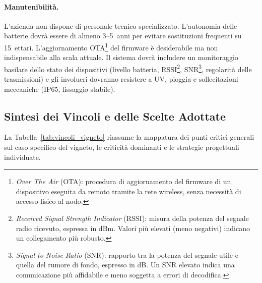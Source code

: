 \paragraph{Manutenibilità.} L'azienda non dispone di personale tecnico specializzato. L'autonomia delle batterie dovrà essere di almeno 3--5~anni per evitare sostituzioni frequenti su 15~ettari. L'aggiornamento OTA\footnote{\textit{Over The Air} (OTA): procedura di aggiornamento del firmware di un dispositivo eseguita da remoto tramite la rete wireless, senza necessità di accesso fisico al nodo.} del firmware è desiderabile ma non indispensabile alla scala attuale. Il sistema dovrà includere un monitoraggio basilare dello stato dei dispositivi (livello batteria, RSSI\footnote{\textit{Received Signal Strength Indicator} (RSSI): misura della potenza del segnale radio ricevuto, espressa in dBm. Valori più elevati (meno negativi) indicano un collegamento più robusto.}, SNR\footnote{\textit{Signal-to-Noise Ratio} (SNR): rapporto tra la potenza del segnale utile e quella del rumore di fondo, espresso in dB. Un SNR elevato indica una comunicazione più affidabile e meno soggetta a errori di decodifica.}, regolarità delle trasmissioni) e gli involucri dovranno resistere a UV, pioggia e sollecitazioni meccaniche (IP65, fissaggio stabile).

\subsection{Sintesi dei Vincoli e delle Scelte Adottate}

La Tabella~\ref{tab:vincoli_vigneto} riassume la mappatura dei punti critici generali sul caso specifico del vigneto, le criticità dominanti e le strategie progettuali individuate.

